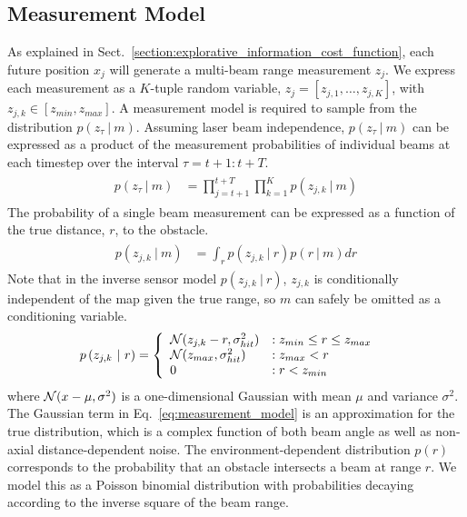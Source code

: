 \subsection{Measurement Model}
\label{sec:measurement_model}

As explained in Sect.~\ref{section:explorative_information_cost_function}, each future position $x_{j}$ will generate a multi-beam range measurement $z_{j}$. We express each measurement as a $K$-tuple random variable, $z_{j} = \left[z_{j, 1}, \dots, z_{j, K}\right]$, with $z_{j, k} \in \left[z_{min}, z_{max}\right]$. A measurement model is required to sample from the distribution $p(z_{\tau} \ \vert \ m)$. Assuming laser beam independence, $p(z_{\tau} \ \vert \ m)$ can be expressed as a product of the measurement probabilities of individual beams at each timestep over the interval $\tau = t+1:t+T$.
%
\begin{align}
  \begin{split}
    p
    \left(
    z_{\tau}
    \ \vert \
    m
    \right)
    &=
    \prod_{j=t+1}^{t+T}
    \prod_{k=1}^{K}
    p
    \left(
    z_{j, k}
    \ \vert \
    m
    \right)
  \end{split}
\end{align}
%
The probability of a single beam measurement can be expressed as a function of the true distance, $r$, to the obstacle.
%
\begin{align}
  \begin{split}
    p
    \left(
    z_{j, k}
    \ \vert \
    m
    \right)
    &=
    \int_{r}
    p
    \left(
    z_{j, k}
    \ \vert \
    r
    \right)
    p
    \left(
    r
    \ \vert \
    m
    \right)
    dr
  \end{split}
\end{align}
%
Note that in the inverse sensor model $p(z_{j,k} \ \vert \ r)$, $z_{j,k}$ is conditionally independent of the map given the true range, so $m$ can safely be omitted as a conditioning variable.
%
\begin{align}
  \begin{split}
    p
    \left(
    z_{j, k}
    \ \vert \
    r
    \right)
    &=
    \left\{
    \begin{array}{ll}
      \mathcal{N}(z_{j, k} - r, \sigma_{hit}^{2}) &: z_{min} \le r \le z_{max} \\
            \mathcal{N}(z_{max}, \sigma_{hit}^{2}) &: z_{max} < r \\
                                            0 &: r < z_{min}
    \end{array}
    \right.
    \label{eq:measurement_model}
  \end{split}
\end{align}
%
where $\mathcal{N}(x - \mu, \sigma^{2})$ is a one-dimensional Gaussian with mean $\mu$ and variance $\sigma^{2}$. The Gaussian term in Eq.~\eqref{eq:measurement_model} is an approximation for the true distribution, which is a complex function of both beam angle as well as non-axial distance-dependent noise. The environment-dependent distribution $p(r)$ corresponds to the probability that an obstacle intersects a beam at range $r$. We model this as a Poisson binomial distribution with probabilities decaying according to the inverse square of the beam range.

